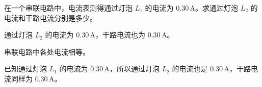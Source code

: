 
\begin{problem}
在一个串联电路中，电流表测得通过灯泡 $L_1$ 的电流为 $0.30\,\mathrm{A}$。求通过灯泡 $L_2$ 的电流和干路电流分别是多少。
\end{problem}

\begin{answer}
通过灯泡 $L_2$ 的电流为 $0.30\,\mathrm{A}$，干路电流也为 $0.30\,\mathrm{A}$。
\end{answer}

\begin{solutions}
串联电路中各处电流相等。

已知通过灯泡 $L_1$ 的电流为 $0.30\,\mathrm{A}$，所以通过灯泡 $L_2$ 的电流也是 $0.30\,\mathrm{A}$，干路电流同样为 $0.30\,\mathrm{A}$。
\end{solutions}

